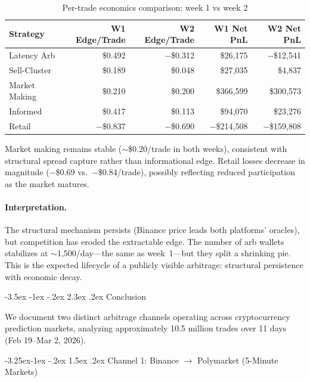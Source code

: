 \documentclass[11pt,a4paper]{article}
\makeatletter
\renewcommand\section{\@startsection{section}{1}{\z@}%
  {-3.5ex \@plus -1ex \@minus -.2ex}%
  {2.3ex \@plus .2ex}%
  {\normalfont\Large\bfseries}}
\renewcommand\subsection{\@startsection{subsection}{2}{\z@}%
  {-3.25ex\@plus -1ex \@minus -.2ex}%
  {1.5ex \@plus .2ex}%
  {\normalfont\large\bfseries}}
\makeatother
\begin{document}
\begin{table}[H]
\centering
\caption{Per-trade economics comparison: week 1 vs week 2}
\label{tab:week2_pertrade}
\small
\begin{tabular}{@{}lrrrr@{}}
\toprule
\textbf{Strategy} & \textbf{W1 Edge/Trade} & \textbf{W2 Edge/Trade} & \textbf{W1 Net PnL} & \textbf{W2 Net PnL} \\
\midrule
Latency Arb   & \$0.492  & $-$\$0.312 & \$26,175  & $-$\$12,541 \\
Sell-Cluster  & \$0.189  & \$0.048   & \$27,035  & \$4,837 \\
Market Making & \$0.210  & \$0.200   & \$366,599 & \$300,573 \\
Informed      & \$0.417  & \$0.113   & \$94,070  & \$23,276 \\
Retail        & $-$\$0.837 & $-$\$0.690 & $-$\$214,508 & $-$\$159,808 \\
\bottomrule
\end{tabular}
\end{table}

Market making remains stable ($\sim$\$0.20/trade in both weeks), consistent with structural spread capture rather than informational edge. Retail losses decrease in magnitude ($-$\$0.69 vs.\ $-$\$0.84/trade), possibly reflecting reduced participation as the market matures.

\paragraph{Interpretation.} The structural mechanism persists (Binance price leads both platforms' oracles), but competition has eroded the extractable edge. The number of arb wallets stabilizes at $\sim$1,500/day---the same as week~1---but they split a shrinking pie. This is the expected lifecycle of a publicly visible arbitrage: structural persistence with economic decay.

\newpage
\section{Conclusion}

We document two distinct arbitrage channels operating across cryptocurrency prediction markets, analyzing approximately 10.5 million trades over 11 days (Feb 19--Mar 2, 2026).

\subsection{Channel 1: Binance $\to$ Polymarket (5-Minute Markets)}
\end{document}
